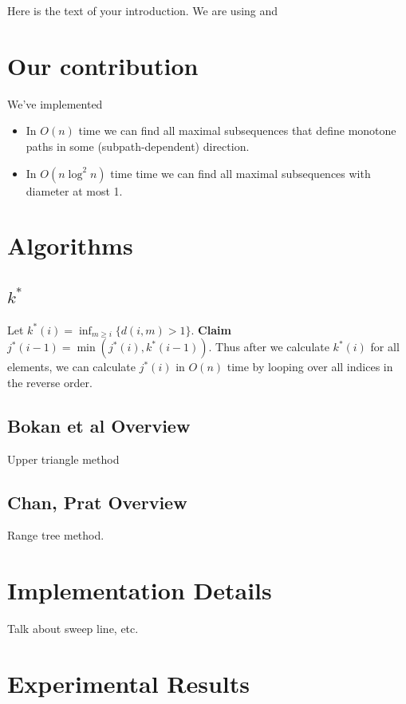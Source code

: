 \documentclass{article}
\begin{document}
Here is the text of your introduction.
We are using \cite{bokal_et_al:LIPIcs:2015:5113} and \cite{chan_et_al:LIPIcs:2016:5920}

\section{Our contribution}
We've implemented
\begin{itemize}
\item In $O(n)$ time  we  can  find  all  maximal  subsequences  that  define  monotone  paths  in  some (subpath-dependent) direction. \cite{bokal_et_al:LIPIcs:2015:5113} 
\item In $O(n \log^2 n)$ time time we can find all maximal subsequences with diameter at most 1. \cite{chan_et_al:LIPIcs:2016:5920}
\end{itemize}

\section{Algorithms}
\subsection{$k^*$}

Let $k^*(i) = \inf_{m \geq i} \{d(i, m) > 1\}$. \textbf{Claim} $j^*(i-1) = \min(j^*(i), k^*(i-1))$. Thus after we calculate $k^*(i)$ for all elements, we can calculate $j^*(i)$ in $O(n)$ time by looping over all indices in the reverse order.

\subsection{Bokan et al Overview}
Upper triangle method

\subsection{Chan, Prat Overview}
Range tree method.

\section{Implementation Details}
Talk about sweep line, etc.

\section{Experimental Results}
\end{document}
